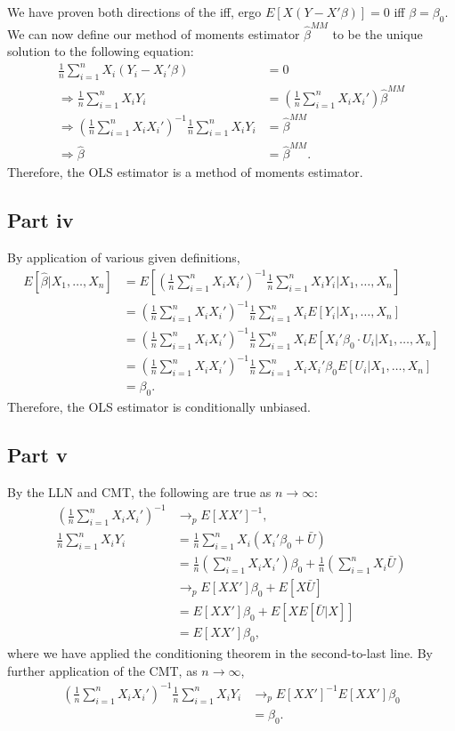 \documentclass[11pt]{article} %
\begin{document}
We have proven both directions of the iff, ergo $E[X(Y-X'\beta)] = 0$ iff $\beta = \beta_0$. We can now define our method of moments estimator $\hat{\beta}^{MM}$ to be the unique solution to the following equation:
\begin{align*}
\frac{1}{n}\sum_{i=1}^n X_i(Y_i-X_i'\beta) &= 0\\
\Rightarrow \frac{1}{n}\sum_{i=1}^n X_iY_i &= \left(\frac{1}{n}\sum_{i=1}^n X_i X_i'\right)\hat{\beta}^{MM}\\
\Rightarrow  \left(\frac{1}{n}\sum_{i=1}^n X_i X_i'\right)^{-1}\frac{1}{n}\sum_{i=1}^n X_iY_i &=\hat{\beta}^{MM} \\
\Rightarrow \hat{\beta} &= \hat{\beta}^{MM}.
\end{align*}
Therefore, the OLS estimator is a method of moments estimator.
\subsection{Part iv}
By application of various given definitions,
\begin{align*}
E[\hat{\beta}|X_1,\dots,X_n] &= E\left[\left(\frac{1}{n}\sum_{i=1}^n X_i X_i'\right)^{-1}\frac{1}{n}\sum_{i=1}^n X_iY_i\Big|X_1,\dots,X_n\right]\\
&= \left(\frac{1}{n}\sum_{i=1}^n X_i X_i'\right)^{-1}\frac{1}{n}\sum_{i=1}^n X_iE[Y_i|X_1,\dots,X_n]\\
&= \left(\frac{1}{n}\sum_{i=1}^n X_i X_i'\right)^{-1}\frac{1}{n}\sum_{i=1}^n X_iE[X_i'\beta_0\cdot U_i|X_1,\dots,X_n]\\
&= \left(\frac{1}{n}\sum_{i=1}^n X_i X_i'\right)^{-1}\frac{1}{n}\sum_{i=1}^n X_iX_i'\beta_0 E[U_i|X_1,\dots,X_n]\\
&= \beta_0.
\end{align*}
Therefore, the OLS estimator is conditionally unbiased.

\subsection{Part v}
By the LLN and CMT, the following are true as $n\rightarrow \infty$:
\begin{align*}
 \left(\frac{1}{n}\sum_{i=1}^n X_i X_i'\right)^{-1} &\rightarrow_p E[XX']^{-1},\\
\frac{1}{n}\sum_{i=1}^n X_i Y_i &= \frac{1}{n}\sum_{i=1}^n X_i (X_i'\beta_0 + \bar{U})\\
&= \frac{1}{n}\left(\sum_{i=1}^nX_i X_i' \right)\beta_0 +  \frac{1}{n}\left(\sum_{i=1}^nX_i \bar{U}\right)\\
&\rightarrow_p E[XX']\beta_0 + E[X \bar{U}]\\
&=  E[XX']\beta_0 + E[X E[\bar{U}|X]]\\
&=  E[XX']\beta_0,
\end{align*}
where we have applied the conditioning theorem in the second-to-last line. By further application of the CMT, as $n\rightarrow \infty$,
\begin{align*}
 \left(\frac{1}{n}\sum_{i=1}^n X_i X_i'\right)^{-1}\frac{1}{n}\sum_{i=1}^n X_iY_i &\rightarrow_p E[XX']^{-1}E[XX']\beta_0\\
&= \beta_0.
\end{align*}
\end{document}
